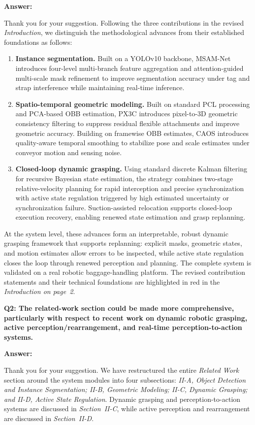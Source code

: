 \documentclass[journal,10pt]{IEEEtran}
\newcommand{\question}[2]{%
  \par\smallskip\noindent
  {\color{responseblue}\bfseries\clubpenalty=10000\widowpenalty=10000 Q#1: #2\par}%
  \par\nobreak\noindent
}
\newcommand{\answer}{%
  \par\smallskip\noindent
  \textbf{Answer: }\ignorespaces
}
\begin{document}
\answer
Thank you for your suggestion. Following the three contributions in the revised \textit{Introduction}, we distinguish the methodological advances from their established foundations as follows:
\begin{enumerate}
\renewcommand{\labelenumi}{\arabic{enumi}.}
\item \textbf{Instance segmentation.} Built on a YOLOv10 backbone, MSAM-Net introduces four-level multi-branch feature aggregation and attention-guided multi-scale mask refinement to improve segmentation accuracy under tag and strap interference while maintaining real-time inference.
\item \textbf{Spatio-temporal geometric modeling.} Built on standard PCL processing and PCA-based OBB estimation, PX3C introduces pixel-to-3D geometric consistency filtering to suppress residual flexible attachments and improve geometric accuracy. Building on framewise OBB estimates, CAOS introduces quality-aware temporal smoothing to stabilize pose and scale estimates under conveyor motion and sensing noise.
\item \textbf{Closed-loop dynamic grasping.} Using standard discrete Kalman filtering for recursive Bayesian state estimation, the strategy combines two-stage relative-velocity planning for rapid interception and precise synchronization with active state regulation triggered by high estimated uncertainty or synchronization failure. Suction-assisted relocation supports closed-loop execution recovery, enabling renewed state estimation and grasp replanning.
\end{enumerate}
At the system level, these advances form an interpretable, robust dynamic grasping framework that supports replanning: explicit masks, geometric states, and motion estimates allow errors to be inspected, while active state regulation closes the loop through renewed perception and planning. The complete system is validated on a real robotic baggage-handling platform. The revised contribution statements and their technical foundations are highlighted in red in the \textit{Introduction on page~2}.

\question{2}{The related-work section could be made more comprehensive, particularly with respect to recent work on dynamic robotic grasping, active perception/rearrangement, and real-time perception-to-action systems.}

\answer
Thank you for your suggestion. We have restructured the entire \textit{Related Work} section around the system modules into four subsections: \textit{II-A, Object Detection and Instance Segmentation; II-B, Geometric Modeling; II-C, Dynamic Grasping; and II-D, Active State Regulation}. Dynamic grasping and perception-to-action systems are discussed in \textit{Section~II-C}, while active perception and rearrangement are discussed in \textit{Section~II-D}.
\end{document}
